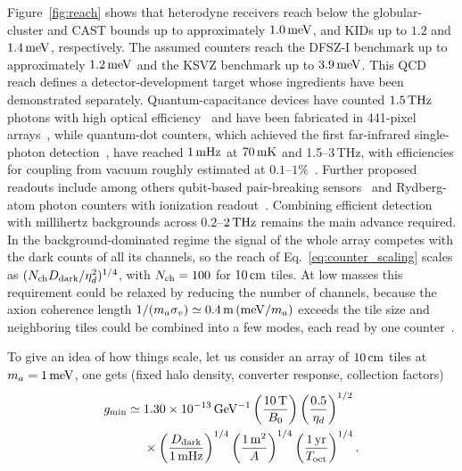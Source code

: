 \documentclass[
  aps,prl,reprint,superscriptaddress,
  amsmath,amssymb,floatfix,nofootinbib
]{revtex4-2}
\begin{document}
Figure~\ref{fig:reach} shows that heterodyne receivers reach below the globular-cluster and CAST bounds up to approximately $1.0\,{\rm meV}$, and KIDs up to $1.2$ and $1.4\,{\rm meV}$, respectively. The assumed counters reach the DFSZ-I benchmark up to approximately $1.2\,{\rm meV}$ and the KSVZ benchmark up to $3.9\,{\rm meV}$. This QCD reach defines a detector-development target whose ingredients have been demonstrated separately. Quantum-capacitance devices have counted $1.5\,{\rm THz}$ photons with high optical efficiency~\cite{Echternach:2017vtf} and have been fabricated in 441-pixel arrays~\cite{Echternach:2021}, while quantum-dot counters, which achieved the first far-infrared single-photon detection~\cite{Komiyama:2000}, have reached $1\,{\rm mHz}$ at $70\,{\rm mK}$ and 1.5--3\,THz, with efficiencies for coupling from vacuum roughly estimated at $0.1$--$1\%$~\cite{Ikushima:2010}. Further proposed readouts include among others qubit-based pair-breaking sensors~\cite{Fink:2023tvb} and Rydberg-atom photon counters with ionization readout~\cite{Banerjee:2025jss}. Combining efficient detection with millihertz backgrounds across $0.2$--$2\,{\rm THz}$ remains the main advance required. In the background-dominated regime the signal of the whole array competes with the dark counts of all its channels, so the reach of Eq.~\eqref{eq:counter_scaling} scales as $(N_{\rm ch}D_{\rm dark}/\eta_d^2)^{1/4}$, with $N_{\rm ch}=100$ for $10\,{\rm cm}$ tiles. At low masses this requirement could be relaxed by reducing the number of channels, because the axion coherence length $1/(m_a\sigma_v)\simeq0.4\,{\rm m}\,({\rm meV}/m_a)$ exceeds the tile size and neighboring tiles could be combined into a few modes, each read by one counter~\cite{Jeong:2017xqz}. 

To give an idea of how things scale, let us consider an array of $10\,{\rm cm}$ tiles at $m_a=1\,{\rm meV}$, one gets (fixed halo density, converter response, collection factors)
\begin{equation}
\begin{aligned}
g_{\min}\simeq{}&
1.30\times10^{-13}\,{\rm GeV^{-1}}
\left(\frac{10\,{\rm T}}{B_0}\right)
\left(\frac{0.5}{\eta_d}\right)^{1/2}
\\
&\times
\left(\frac{D_{\rm dark}}{1\,{\rm mHz}}\right)^{1/4}
\left(\frac{1\,{\rm m^2}}{A}\right)^{1/4}
\left(\frac{1\,{\rm yr}}{T_{\rm oct}}\right)^{1/4}.
\end{aligned}
\label{eq:counter_scaling}
\end{equation}
\end{document}
